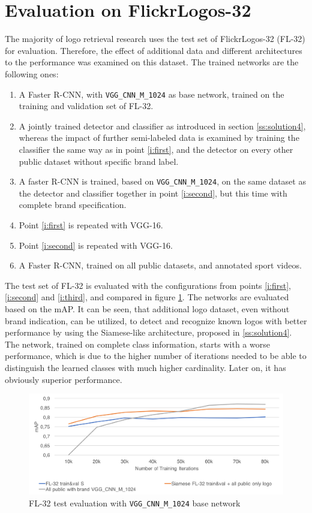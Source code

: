 \section{Evaluation on FlickrLogos-32}\label{s:fleval}
The majority of logo retrieval research uses the test set of FlickrLogos-32 (FL-32) for evaluation. Therefore, the effect of additional data and different architectures to the performance was examined on this dataset. The trained networks are the following ones:
\begin{enumerate}
    \item\label{i:first} A Faster R-CNN, with \texttt{VGG\_CNN\_M\_1024} as base network, trained on the training and validation set of FL-32.
    \item\label{i:second} A jointly trained detector and classifier as introduced in section \ref{ss:solution4}, whereas the impact of further semi-labeled data is examined by training the classifier the same way as in point \ref{i:first}, and the detector on every other public dataset without specific brand label.
    \item\label{i:third} A faster R-CNN is trained, based on \texttt{VGG\_CNN\_M\_1024}, on the same dataset as the detector and classifier together in point \ref{i:second}, but this time with complete brand specification.
    \item Point \ref{i:first} is repeated with VGG-16.
    \item Point \ref{i:second} is repeated with VGG-16.
    \item A Faster R-CNN, trained on all public datasets, and annotated sport videos.
\end{enumerate}

The test set of FL-32 is evaluated with the configurations from points \ref{i:first}, \ref{i:second} and \ref{i:third}, and compared in figure \ref{f:vggcnnmfltest}. The networks are evaluated based on the mAP. It can be seen, that additional logo dataset, even without brand indication, can be utilized, to detect and recognize known logos with better performance by using the Siamese-like architecture, proposed in \ref{ss:solution4}. The network, trained on complete class information, starts with a worse performance, which is due to the higher number of iterations needed to be able to distinguish the learned classes with much higher cardinality. Later on, it has obviously superior performance.

\begin{figure}
  \centering
  \includegraphics[width=120mm]{images/mt/vggcnnmfltest.png}
  \caption{FL-32 test evaluation with \texttt{VGG\_CNN\_M\_1024} base network}
  \label{f:vggcnnmfltest}
\end{figure}


